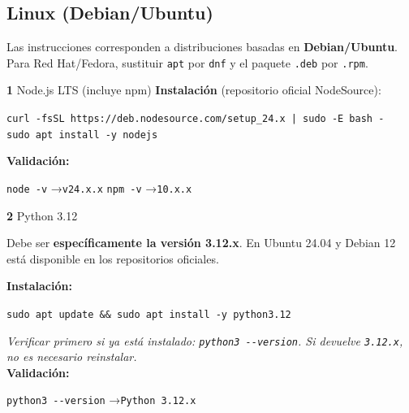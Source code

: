 \documentclass[11pt, a4paper]{article}
\newcommand{\version}[1]{\texttt{\textcolor{ibmblue}{#1}}}
\newcommand{\cmd}[1]{\texttt{\textcolor{ibmdark}{\small #1}}}
\newcommand{\checkmark}{\textcolor{ibmgreen}{\faCheckCircle}}
\begin{document}
\subsection{Linux (Debian/Ubuntu)}
\label{sec:linux}

Las instrucciones corresponden a distribuciones basadas en \textbf{Debian/Ubuntu}. Para Red Hat/Fedora, sustituir \cmd{apt} por \cmd{dnf} y el paquete \texttt{.deb} por \texttt{.rpm}.

\vspace{8pt}
\begin{labbox}[ibmdark]{\textbf{1} \quad Node.js LTS (incluye npm)}
\textbf{Instalación} (repositorio oficial NodeSource):
\begin{center}
\small
\cmd{curl -fsSL https://deb.nodesource.com/setup\_24.x | sudo -E bash -}\\
\cmd{sudo apt install -y nodejs}
\end{center}
\vspace{4pt}
\textbf{Validación:}
\begin{center}
  \cmd{node -v} \quad→\quad \version{v24.x.x} \checkmark \qquad
  \cmd{npm -v} \quad→\quad \version{10.x.x} \checkmark
\end{center}
\end{labbox}

\vspace{6pt}
\begin{labbox}[ibmdark]{\textbf{2} \quad Python 3.12}
\begin{criticalbox}
  Debe ser \textbf{específicamente la versión 3.12.x}. En Ubuntu 24.04 y Debian 12 está disponible en los repositorios oficiales.
\end{criticalbox}
\vspace{6pt}
\textbf{Instalación:}
\begin{center}
  \cmd{sudo apt update \&\& sudo apt install -y python3.12}
\end{center}
\textit{Verificar primero si ya está instalado: \cmd{python3 -{}-version}. Si devuelve \version{3.12.x}, no es necesario reinstalar.}
\vspace{4pt}\\
\textbf{Validación:}
\begin{center}
  \cmd{python3 -{}-version} \quad→\quad \version{Python 3.12.x} \checkmark
\end{center}
\end{labbox}
\end{document}
